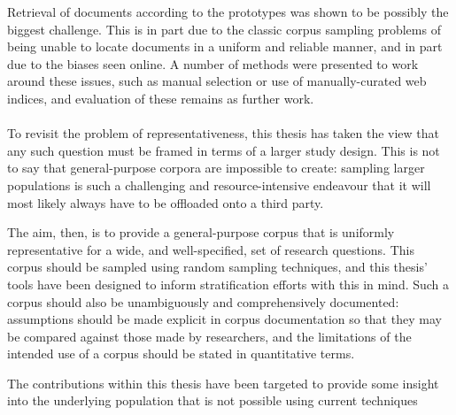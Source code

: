 Retrieval of documents according to the prototypes was shown to be possibly the biggest challenge.  This is in part due to the classic corpus sampling problems of being unable to locate documents in a uniform and reliable manner, and in part due to the biases seen online.  A number of methods were presented to work around these issues, such as manual selection or use of manually-curated web indices, and evaluation of these remains as further work.




\paragraph{}
To revisit the problem of representativeness, this thesis has taken the view that any such question must be framed in terms of a larger study design.  This is not to say that general-purpose corpora are impossible to create: sampling larger populations is such a challenging and resource-intensive endeavour that it will most likely always have to be offloaded onto a third party.

The aim, then, is to provide a general-purpose corpus that is uniformly representative for a wide, and well-specified, set of research questions.  This corpus should be sampled using random sampling techniques, and this thesis' tools have been designed to inform stratification efforts with this in mind.  Such a corpus should also be unambiguously and comprehensively documented: assumptions should be made explicit in corpus documentation so that they may be compared against those made by researchers, and the limitations of the intended use of a corpus should be stated in quantitative terms.

The contributions within this thesis have been targeted to provide some insight into the underlying population that is not possible using current techniques






